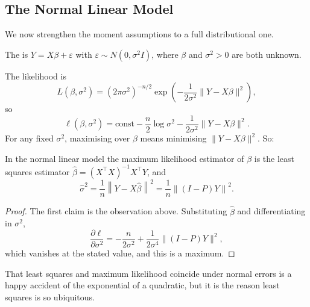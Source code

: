 \subsection{The Normal Linear Model}

We now strengthen the moment assumptions to a full distributional one.

\begin{definition}
  The  is $Y = X\beta + \varepsilon$ with $\varepsilon \sim N(0,\sigma^2 I)$, where $\beta$ and $\sigma^2 > 0$ are both unknown.
\end{definition}

The likelihood is
$$
L(\beta,\sigma^2) = (2\pi\sigma^2)^{-n/2}\exp\left(-\frac{1}{2\sigma^2}\|Y-X\beta\|^2\right),
$$
so
$$
\ell(\beta,\sigma^2) = \text{const} - \frac n2\log\sigma^2 - \frac{1}{2\sigma^2}\|Y-X\beta\|^2.
$$
For any fixed $\sigma^2$, maximising over $\beta$ means minimising $\|Y - X\beta\|^2$. So:

\begin{proposition}
  In the normal linear model the maximum likelihood estimator of $\beta$ is the least squares estimator $\hat\beta = (X^\top X)^{-1}X^\top Y$, and
  $$
  \hat\sigma^2 = \frac{1}{n}\left\|Y - X\hat\beta\right\|^2 = \frac{1}{n}\left\|(I-P)Y\right\|^2.
  $$
\end{proposition}
\begin{proof}
  The first claim is the observation above. Substituting $\hat\beta$ and differentiating in $\sigma^2$,
  $$
  \frac{\partial\ell}{\partial\sigma^2} = -\frac{n}{2\sigma^2}+\frac{1}{2\sigma^4}\|(I-P)Y\|^2,
  $$
  which vanishes at the stated value, and this is a maximum.
\end{proof}

That least squares and maximum likelihood coincide under normal errors is a happy accident of the exponential of a quadratic, but it is the reason least squares is so ubiquitous.

